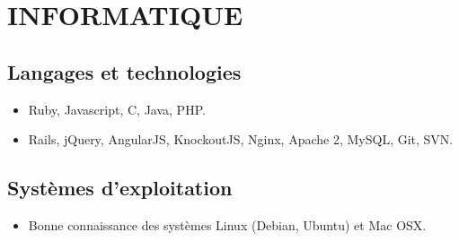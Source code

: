 \section{INFORMATIQUE}

\vspace{-0.1cm}

\subsection{Langages et technologies}

\begin{itemize}
  \item Ruby, Javascript, C, Java, PHP.
  \item Rails, jQuery, AngularJS, KnockoutJS, Nginx, Apache 2, MySQL, Git, SVN.
\end{itemize}

\subsection{Systèmes d'exploitation}

\begin{itemize}
  \item Bonne connaissance des systèmes Linux (Debian, Ubuntu) et Mac OSX.
\end{itemize}
